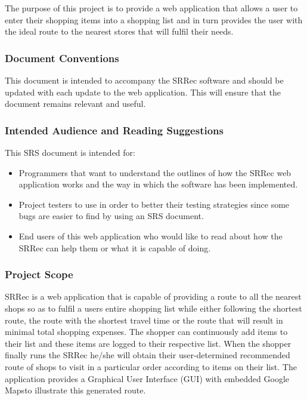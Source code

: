 \documentclass[10pt,twocolumn]{witseiepaper}
\begin{document}
			The purpose of this project is to provide a web application that allows a user to enter their shopping items into a shopping list and in turn provides the user with the ideal route to the nearest stores that will fulfil their needs.
		
		\subsubsection{Document Conventions}
		
			This document is intended to accompany the SRRec software and should be updated with each update to the web application. This will ensure that the document remains relevant and useful.
		
		\subsubsection{Intended Audience and Reading Suggestions}
		
			This SRS document is intended for:
			\begin{itemize}
				\item Programmers that want to understand the outlines of how the SRRec web application works and the way in which the software has been implemented.
				\item Project testers to use in order to better their testing strategies since some bugs are easier to find by using an SRS document.
				\item End users of this web application who would like to read about how the SRRec can help them or what it is capable of doing.
			\end{itemize}
		
		\subsubsection{Project Scope}
			
			SRRec is a web application that is capable of providing a route to all the nearest shops so as to fulfil a users entire shopping list while either following the shortest route, the route with the shortest travel time or the route that will result in minimal total shopping expenses. The shopper can continuously add items to their list and these items are logged to their respective list. When the shopper finally runs the SRRec he/she will obtain their user-determined recommended route of shops to visit in a particular order according to items on their list. The application provides a Graphical User Interface (GUI) with embedded Google Mapsto illustrate this generated route. \\
			
\end{document}
